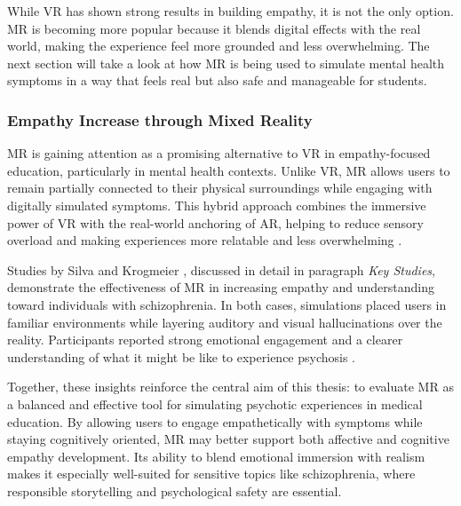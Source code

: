 \vspace{1em}

While VR has shown strong results in building empathy, it is not the only option. MR is becoming more popular because it blends digital effects with the real world, making the experience feel more grounded and less overwhelming. The next section will take a look at how MR is being used to simulate mental health symptoms in a way that feels real but also safe and manageable for students.

\subsubsection{Empathy Increase through Mixed Reality}

MR is gaining attention as a promising alternative to VR in empathy-focused education, particularly in mental health contexts. Unlike VR, MR allows users to remain partially connected to their physical surroundings while engaging with digitally simulated symptoms. This hybrid approach combines the immersive power of VR with the real-world anchoring of AR, helping to reduce sensory overload and making experiences more relatable and less overwhelming \cite{Zare-Bidaki2022}.

\vspace{1em}

Studies by Silva \cite{Silva2017} and Krogmeier \cite{Krogmeier2024}, discussed in detail in paragraph \textit{Key Studies}, demonstrate the effectiveness of MR in increasing empathy and understanding toward individuals with schizophrenia. In both cases, simulations placed users in familiar environments while layering auditory and visual hallucinations over the reality. Participants reported strong emotional engagement and a clearer understanding of what it might be like to experience psychosis \cite{Silva2017, Krogmeier2024}. 

\vspace{1em}

Together, these insights reinforce the central aim of this thesis: to evaluate MR as a balanced and effective tool for simulating psychotic experiences in medical education. By allowing users to engage empathetically with symptoms while staying cognitively oriented, MR may better support both affective and cognitive empathy development. Its ability to blend emotional immersion with realism makes it especially well-suited for sensitive topics like schizophrenia, where responsible storytelling and psychological safety are essential.

